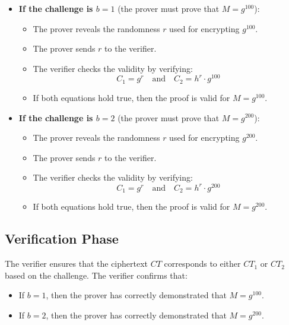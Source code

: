 \documentclass[12pt]{article}
\begin{document}
\begin{itemize}
    \item \textbf{If the challenge is \( b = 1 \)} (the prover must prove that \( M = g^{100} \)):
    \begin{itemize}
        \item The prover reveals the randomness \( r \) used for encrypting \( g^{100} \).
        \item The prover sends \( r \) to the verifier.
        \item The verifier checks the validity by verifying:
        \[
        C_1 = g^r \quad \text{and} \quad C_2 = h^r \cdot g^{100}
        \]
        \item If both equations hold true, then the proof is valid for \( M = g^{100} \).
    \end{itemize}
    
    \item \textbf{If the challenge is \( b = 2 \)} (the prover must prove that \( M = g^{200} \)):
    \begin{itemize}
        \item The prover reveals the randomness \( r \) used for encrypting \( g^{200} \).
        \item The prover sends \( r \) to the verifier.
        \item The verifier checks the validity by verifying:
        \[
        C_1 = g^r \quad \text{and} \quad C_2 = h^r \cdot g^{200}
        \]
        \item If both equations hold true, then the proof is valid for \( M = g^{200} \).
    \end{itemize}
\end{itemize}

\subsection{Verification Phase}
The verifier ensures that the ciphertext \( CT \) corresponds to either \( CT_1 \) or \( CT_2 \) based on the challenge. The verifier confirms that:
\begin{itemize}
    \item If \( b = 1 \), then the prover has correctly demonstrated that \( M = g^{100} \).
    \item If \( b = 2 \), then the prover has correctly demonstrated that \( M = g^{200} \).
\end{itemize}
\end{document}
